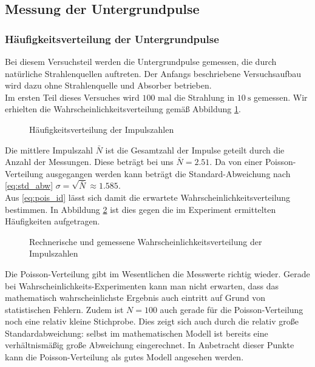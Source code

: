 \subsection{Messung der Untergrundpulse}
\subsubsection{Häufigkeitsverteilung der Untergrundpulse}
Bei diesem Versuchsteil werden die Untergrundpulse gemessen, die durch natürliche Strahlenquellen auftreten. Der Anfangs beschriebene Versuchsaufbau wird dazu ohne Strahlenquelle und Absorber betrieben. \\
Im ersten Teil dieses Versuches wird $ 100 $ mal die Strahlung in $ \SI{10}{\second} $ gemessen. Wir erhielten die Wahrscheinlichkeitsverteilung gemäß Abbildung \ref{fig:haeuf_hint_1}.

\begin{figure}[h!]
	\centering
	
	\caption{Häufigkeitsverteilung der Impulszahlen}
	\label{fig:haeuf_hint_1}
\end{figure}

Die mittlere Impulszahl $ \bar N $ ist die Gesamtzahl der Impulse geteilt durch die Anzahl der Messungen. Diese beträgt bei uns $ \bar N = \num{2.51} $. Da von einer Poisson-Verteilung ausgegangen werden kann beträgt die Standard-Abweichung nach \eqref{eq:std_abw} $ \sigma = \sqrt{\bar N} \approx \num{1.585} $.\\
Aus \eqref{eq:pois_id} lässt sich damit die erwartete Wahrscheinlichkeitsverteilung bestimmen. In Abbildung \ref{fig:a2_rech} ist dies gegen die im Experiment ermittelten Häufigkeiten aufgetragen.

\begin{figure}[h!]
\centering

\caption{Rechnerische und gemessene Wahrscheinlichkeitsverteilung der Impulszahlen}
\label{fig:a2_rech}
\end{figure}

Die Poisson-Verteilung gibt im Wesentlichen die Messwerte richtig wieder. Gerade bei Wahrscheinlichkeits-Experimenten kann man nicht erwarten, dass das mathematisch wahrscheinlichste Ergebnis auch eintritt auf Grund von statistischen Fehlern. Zudem ist $ N = 100 $ auch gerade für die Poisson-Verteilung noch eine relativ kleine Stichprobe. Dies zeigt sich auch durch die relativ große Standardabweichung: selbst im mathematischen Modell ist bereits eine verhältnismäßig große Abweichung eingerechnet. In Anbetracht dieser Punkte kann die Poisson-Verteilung als gutes Modell angesehen werden.

